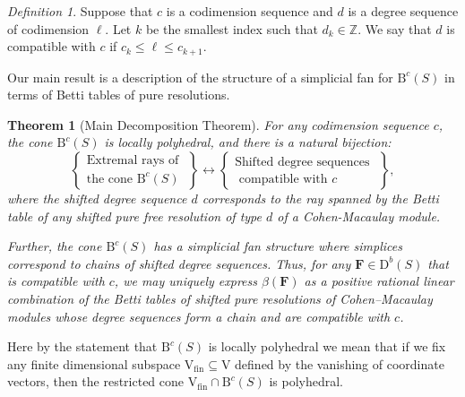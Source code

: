 \documentclass[12pt]{amsart}
\newtheorem{thm}[lemma]{Theorem}
\theoremstyle{definition}
\theoremstyle{remark}
\newtheorem{defn}[lemma]{Definition}
\newcommand{\ZZ}{\mathbb{Z}}
\newcommand{\VV}{\mathrm{V}}
\newcommand{\bb}{c}
\newcommand{\dd}{d}
\newcommand{\FF}{\mathbf{F}}
\newcommand{\defi}[1]{\textsf{#1}} %
\newcommand{\DD}{\mathrm{D}}
\newcommand{\BBQ}{\mathrm{B}}
\begin{document}
\begin{defn}\label{defn:deg compatible}
Suppose that $\bb$ is a codimension sequence  and $\dd$ is a degree sequence  of codimension $\ell$. Let $k$ be the smallest index
such that $d_{k}\in \ZZ$. We say that $\dd$ is \defi{compatible with $\bb$} if $\bb_k\leq \ell\leq \bb_{k+1}$.
\end{defn}



Our main result is a description of the structure of a simplicial fan for $\BBQ^{\bb}(S)$ in terms of  Betti tables of pure resolutions.  

\begin{thm}[Main Decomposition Theorem]\label{thm:extremal rays refined}
For any codimension sequence $\bb$, the cone $\BBQ^{\bb}(S)$ is locally polyhedral, and there is a natural bijection:
\[
\left\{
\begin{matrix}
\text{Extremal rays of }\\
\text{the cone } \BBQ^{\bb}(S)
\end{matrix}
\right\}
\longleftrightarrow
\left\{
\begin{matrix}
\text{Shifted degree sequences }\\
\text{ compatible with $\bb$}
\end{matrix}
\right\},
\]
where the shifted degree sequence $\dd$ corresponds to the ray spanned by 
the Betti table of any shifted pure free resolution of type $\dd$ of a Cohen-Macaulay module. 

Further, the cone $\BBQ^{\bb}(S)$ has a simplicial fan structure where simplices correspond to chains of shifted degree sequences.  Thus, for any $\FF\in \DD^b(S)$ that is compatible with $\bb$, we may uniquely express $\beta(\FF)$ as a positive rational linear combination of the Betti tables of shifted pure resolutions of Cohen--Macaulay modules whose degree sequences form a chain and are compatible with $\bb$.
\end{thm}

Here by the statement that $\BBQ^{\bb}(S)$ is \defi{locally polyhedral} we mean that if we fix any finite dimensional subspace $\VV_{\text{fin}}\subseteq \VV$ defined by the vanishing of coordinate vectors, then the restricted cone $\VV_{\text{fin}}\cap \BBQ^{\bb}(S)$ is polyhedral. 
\end{document}
